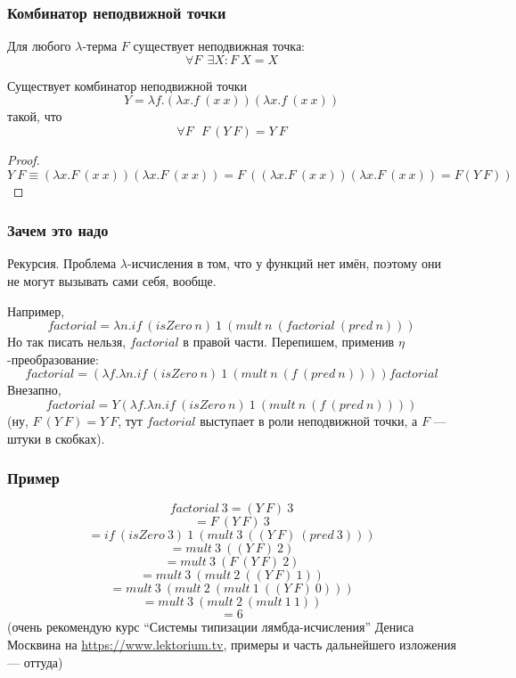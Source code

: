 \documentclass{../../slides-style}
\begin{document}
    \begin{frame}
        \frametitle{Комбинатор неподвижной точки}
        \begin{rustheorem}
            Для любого $\lambda$-терма $F$ существует неподвижная точка:
            $$\forall F\ \ \exists X : F\ X = X$$
            \vspace{-5mm}
        \end{rustheorem}
        \vspace{-5mm}
        \begin{rustheorem}
            Существует комбинатор неподвижной точки
            $$Y = \lambda f.(\lambda x.f\ (x\ x)) (\lambda x.f\ (x\ x))$$
            такой, что 
            $$\forall F\ \ \ F\ (Y\ F) = Y\ F$$
        \end{rustheorem}
        \vspace{-5mm}
        \begin{proof}
            \vspace{-7mm}
            $$Y\ F \equiv (\lambda x.F\ (x\ x))(\lambda x.F\ (x\ x)) 
                = F\ ((\lambda x.F\ (x\ x))(\lambda x.F\ (x\ x)) = F(Y\ F))$$
            \vspace{-10mm}
        \end{proof}
    \end{frame}

    \begin{frame}
        \frametitle{Зачем это надо}
        Рекурсия. Проблема $\lambda$-исчисления в том, что у функций нет имён, поэтому они не могут 
        вызывать сами себя, вообще.
        
        Например,
        $$factorial = \lambda n. if\ (isZero\ n)\ 1\ (mult\ n\ (factorial\ (pred\ n)))$$
        Но так писать нельзя, $factorial$ в правой части. Перепишем, применив $\eta$-преобразование:
        $$factorial = (\lambda f.\lambda n.if\ (isZero\ n)\ 1\ (mult\ n\ (f\ (pred\ n)))) factorial$$
        Внезапно, 
        $$factorial = Y (\lambda f.\lambda n.if\ (isZero\ n)\ 1\ (mult\ n\ (f\ (pred\ n))))$$
        (ну, $F\ (Y\ F) = Y\ F$, тут $factorial$ выступает в роли неподвижной точки, а $F$ --- 
        штуки в скобках).
    \end{frame}

    \begin{frame}
        \frametitle{Пример}
        $$factorial\ 3 = (Y\ F)\ 3$$
        $$= F\ (Y\ F)\ 3$$
        $$= if\ (isZero\ 3)\ 1\ (mult\ 3\ ((Y\ F)\ (pred\ 3)))$$
        $$= mult\ 3\ ((Y\ F)\ 2)$$
        $$= mult\ 3\ (F\ (Y\ F)\ 2)$$
        $$= mult\ 3\ (mult\ 2\ ((Y\ F)\ 1))$$
        $$= mult\ 3\ (mult\ 2\ (mult\ 1\ ((Y\ F)\ 0)))$$
        $$= mult\ 3\ (mult\ 2\ (mult\ 1\ 1))$$
        $$= 6$$
        (очень рекомендую курс ``Системы типизации лямбда-исчисления'' Дениса Москвина на \url{https://www.lektorium.tv}, примеры и часть дальнейшего изложения --- оттуда)
    \end{frame}
\end{document}
